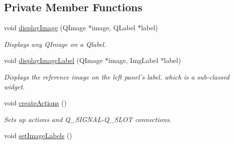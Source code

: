 \subsection*{Private Member Functions}
\begin{CompactItemize}
\item 
void \hyperlink{classQcorr_925b0715143a0afa981851547f8b9256}{displayImage} (QImage $\ast$image, QLabel $\ast$label)
\begin{CompactList}\small\item\em Displays any QImage on a Qlabel. \item\end{CompactList}\item 
void \hyperlink{classQcorr_fddb022a6024a32be3b47016308d6c50}{displayImageLabel} (QImage $\ast$image, ImgLabel $\ast$label)
\begin{CompactList}\small\item\em Displays the reference image on the left panel's label. which is a sub-classed widget. \item\end{CompactList}\item 
\hypertarget{classQcorr_54af608880477563fa8ebcb0d066b447}{
void \hyperlink{classQcorr_54af608880477563fa8ebcb0d066b447}{createActions} ()}
\label{classQcorr_54af608880477563fa8ebcb0d066b447}

\begin{CompactList}\small\item\em Sets up actions and Q\_\-SIGNAL-Q\_\-SLOT connections. \item\end{CompactList}\item 
\hypertarget{classQcorr_17beb7cf946cdd82f587e3b4e5ee7f19}{
void \hyperlink{classQcorr_17beb7cf946cdd82f587e3b4e5ee7f19}{setImageLabels} ()}
\label{classQcorr_17beb7cf946cdd82f587e3b4e5ee7f19}


\end{CompactItemize}
